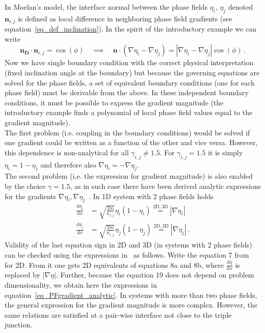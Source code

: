 	In Moelan's model, the interface normal between the phase fields $\eta_i,\,\eta_j$ denoted $\bm{n}_{i,j}$ is defined as local difference in neighboring phase field gradients (see equation~\ref{eq_def_inclination}). In the spirit of the introductory example we can write
	\begin{equation}
		\bm{n_D}\cdot\bm{n}_{i,j} = \cos(\phi) \quad \implies \quad \bm{n}\cdot(\nabla\eta_i-\nabla\eta_j) = |\nabla\eta_i-\nabla\eta_j|\cos(\phi) \,.
	\end{equation}
	Now we have single boundary condition with the correct physical interpretation (fixed inclination angle at the boundary) but because the governing equations are solved for the phase fields, a set of equivalent boundary conditions (one for each phase field) must be derivable from the above. In these independent boundary conditions, it must be possible to express the gradient magnitude (the introductory example finds a polynomial of local phase field values equal to the gradient magnitude). \\
	The first problem (i.e. coupling in the boundary conditions) would be solved if one gradient could be written as a function of the other and vice versa. However, this dependence is non-analytical for all $\gamma_{i,j}\neq1.5$. For $\gamma_{i,j}=1.5$ it is simply $\eta_i = 1-\eta_j$ and therefore also $\nabla\eta_i=-\nabla\eta_j$.~\cite{Moelans2008} \\
	The second problem (i.e. the expression for gradient magnitude) is also enabled by the choice $\gamma=1.5$, as in such case there have been derived analytic expressions for the gradients $\nabla\eta_i,\nabla\eta_j$~\cite{Moelans2008}. In 1D system with 2 phase fields holds
	\begin{equation} \label{eq_PFgradient_analytic}
		\begin{split}
			\frac{\mathrm{d}\eta_i}{\mathrm{d}x} &= \sqrt{\frac{2m}{\kappa_{i,j}}}\eta_i(1-\eta_i) \overset{\mathrm{2D, 3D}}{=} |\nabla\eta_i| \\
			\frac{\mathrm{d}\eta_j}{\mathrm{d}x} &= \sqrt{\frac{2m}{\kappa_{i,j}}}\eta_j(1-\eta_j) \overset{\mathrm{2D, 3D}}{=} |\nabla\eta_j| \,.
		\end{split}
	\end{equation}
	Validity of the last equation sign in 2D and 3D (in systems with 2 phase fields) can be checked using the expressions in~\cite{Moelans2008} as follows. Write the equation 7 from~\cite{Moelans2008} for 2D. From it one gets 2D equivalents of equations 8a and 8b, where $\frac{\mathrm{d}\eta}{\mathrm{d}x}$ is replaced by $|\nabla\eta|$. Further, because the equation 19 does not depend on problem dimensionality, we obtain here the expressions in equation~\ref{eq_PFgradient_analytic}. In systems with more than two phase fields, the general expression for the gradient magnitude is more complex. However, the same relations are satisfied at a pair-wise interface not close to the triple junction. \\
